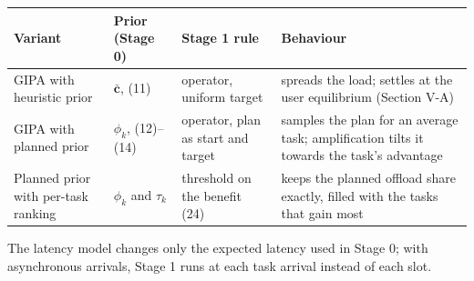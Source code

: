 \documentclass[10pt]{article}
\begin{document}
\vspace{5pt}
\footnotesize
\begin{tabularx}{\textwidth}{@{}l l l Y@{}}
\toprule
\textbf{Variant} & \textbf{Prior (Stage 0)} & \textbf{Stage 1 rule} & \textbf{Behaviour} \\
\midrule
GIPA with heuristic prior & $\bar{\mathbf c}$, (11) & operator, uniform target & spreads the load; settles at the user equilibrium (Section V-A) \\
GIPA with planned prior & $\phi_k$, (12)--(14) & operator, plan as start and target & samples the plan for an average task; amplification tilts it towards the task's advantage \\
Planned prior with per-task ranking & $\phi_k$ and $\tau_k$ & threshold on the benefit (24) & keeps the planned offload share exactly, filled with the tasks that gain most \\
\bottomrule
\end{tabularx}

\vspace{2pt}
The latency model changes only the expected latency used in Stage 0; with asynchronous arrivals, Stage 1 runs at each task arrival instead of each slot.
\end{document}
